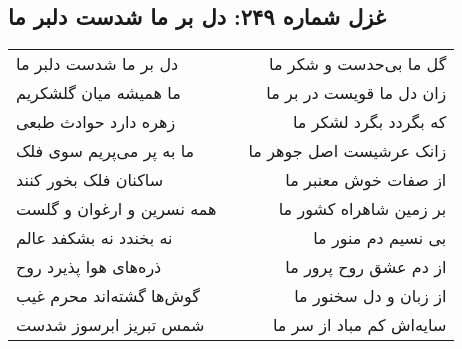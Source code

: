 \begin{center}
\section*{غزل شماره ۲۴۹: دل بر ما شدست دلبر ما}
\label{sec:0249}
\begin{longtable}{l p{0.5cm} r}
دل بر ما شدست دلبر ما
&&
گل ما بی‌حدست و شکر ما
\\
ما همیشه میان گلشکریم
&&
زان دل ما قویست در بر ما
\\
زهره دارد حوادث طبعی
&&
که بگردد بگرد لشکر ما
\\
ما به پر می‌پریم سوی فلک
&&
زانک عرشیست اصل جوهر ما
\\
ساکنان فلک بخور کنند
&&
از صفات خوش معنبر ما
\\
همه نسرین و ارغوان و گلست
&&
بر زمین شاهراه کشور ما
\\
نه بخندد نه بشکفد عالم
&&
بی نسیم دم منور ما
\\
ذره‌های هوا پذیرد روح
&&
از دم عشق روح پرور ما
\\
گوش‌ها گشته‌اند محرم غیب
&&
از زبان و دل سخنور ما
\\
شمس تبریز ابرسوز شدست
&&
سایه‌اش کم مباد از سر ما
\\
\end{longtable}
\end{center}
